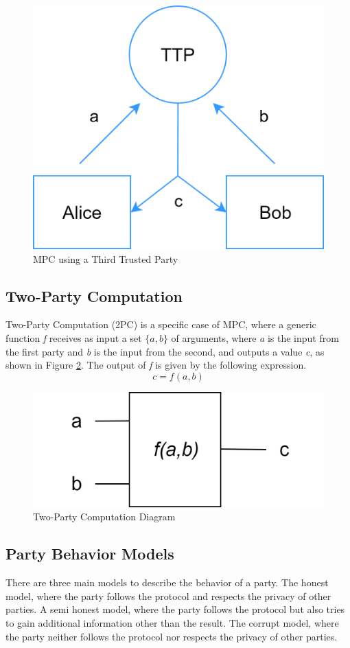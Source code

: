 \begin{refsection}
\renewcommand{\figurename}{Figure}
\begin{figure}[H]
\centering
\includegraphics[width=.3\linewidth]{./sdf/classical_mpc/figures/ttp_scheme}
\caption{MPC using a Third Trusted Party}
\label{fig:ttpscheme}
\end{figure}

\subsection{Two-Party Computation}
Two-Party Computation (2PC) is a specific case of MPC, where a generic function \textit{f} receives as input a set $\{a,b\}$
of arguments, where \textit{a} is the input from the first party and \textit{b} is the input from the second,
and outputs a value \textit{c}, as shown in Figure \ref{fig:tpcscheme}.
The output of \textit{f} is given by the following expression.
\begin{equation}\label{eq:tpc}
c = f(a,b)
\end{equation}

\renewcommand{\figurename}{Figure}
\begin{figure}[H]
\centering
\includegraphics[width=.4\linewidth]{./sdf/classical_mpc/figures/two_party_computation_scheme}
\caption{Two-Party Computation Diagram}
\label{fig:tpcscheme}
\end{figure}

\subsection{Party Behavior Models}
There are three main models to describe the behavior of a party. The honest model, where the party follows the protocol and respects the privacy of other parties. A semi honest model, where the party follows the protocol but also tries to gain additional information other than the result. The corrupt model, where the party neither follows the protocol nor respects the privacy of other parties.


\end{refsection}
